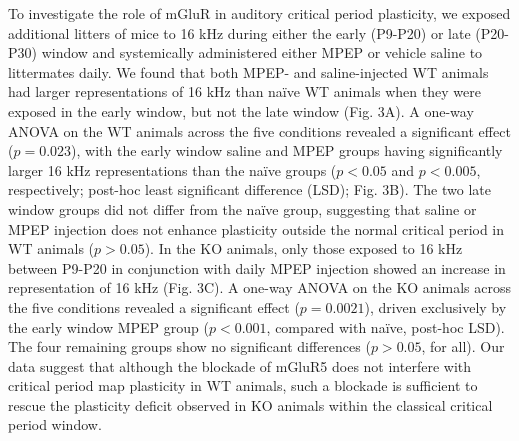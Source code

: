 To investigate the role of mGluR in auditory critical period plasticity, we exposed additional litters of mice to 16 kHz during either the early (P9-P20) or late (P20-P30) window and systemically administered either MPEP or vehicle saline to littermates daily. We found that both MPEP- and saline-injected WT animals had larger representations of 16 kHz than na\"ive WT animals when they were exposed in the early window, but not the late window (Fig. 3A). A one-way ANOVA on the WT animals across the five conditions revealed a significant effect ($p=0.023$), with the early window saline and MPEP groups having significantly larger 16 kHz representations than the na\"ive groups ($p<0.05$ and $p<0.005$, respectively; post-hoc least significant difference (LSD); Fig. 3B). The two late window groups did not differ from the na\"ive group, suggesting that saline or MPEP injection does not enhance plasticity outside the normal critical period in WT animals ($p>0.05$). In the KO animals, only those exposed to 16 kHz between P9-P20 in conjunction with daily MPEP injection showed an increase in representation of 16 kHz (Fig. 3C). A one-way ANOVA on the KO animals across the five conditions revealed a significant effect ($p=0.0021$), driven exclusively by the early window MPEP group ($p<0.001$, compared with na\"ive, post-hoc LSD). The four remaining groups show no significant differences ($p>0.05$, for all). Our data suggest that although the blockade of mGluR5 does not interfere with critical period map plasticity in WT animals, such a blockade is sufficient to rescue the plasticity deficit observed in KO animals within the classical critical period window.


